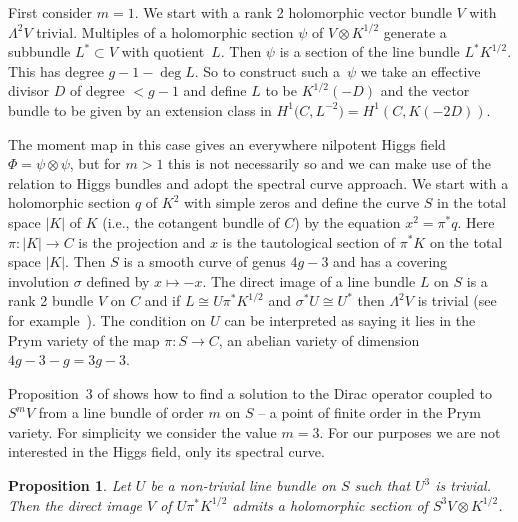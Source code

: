 \documentclass[11pt]{article}
\numberwithin{equation}{section}
\newtheorem{proposition}{Proposition}
\begin{document}
 First consider $m=1$.
We start with a rank 2 holomorphic vector bundle $V$ with $\Lambda^2V$ trivial. Multiples of a holomorphic section $\psi$ of $V\otimes K^{1/2}$ generate a subbundle $L^*\subset V$ with quotient~$L$. Then $\psi$ is a section of the line bundle $L^*K^{1/2}$. This has degree $g-1-\deg L$. So to construct such a~$\psi$ we take an effective divisor $D$ of degree $< g-1$ and define $L$ to be $K^{1/2}(-D)$ and the vector bundle to be given by an extension class in $H^1\big(C,L^{-2}\big)=H^1(C,K(-2D))$.

The moment map in this case gives an everywhere nilpotent Higgs field $\Phi=\psi\otimes \psi$, but for $m>1$ this is not necessarily so and we can make use of the relation to Higgs bundles and adopt the spectral curve approach.
We start with a holomorphic section $q$ of $K^2$ with simple zeros and define the curve $S$ in the total space $\vert K\vert$ of $K$ (i.e., the cotangent bundle of $C$) by the equation $x^2=\pi^*q$. Here $\pi\colon \vert K\vert \rightarrow C$ is the projection and $x$ is the tautological section of $\pi^*K$ on the total space $\vert K\vert $. Then $S$ is a smooth curve of genus $4g-3$ and has a covering involution $\sigma$ defined by $x\mapsto-x$. The direct image of a line bundle $L$ on $S$ is a rank 2 bundle $V$ on $C$ and if $L\cong U\pi^*K^{1/2}$ and $\sigma^*U\cong U^*$ then $\Lambda^2V$ is trivial (see for example~\cite{BeauvilleA/NarasimhanM/RamananS}). The condition on $U$ can be interpreted as saying it lies in the Prym variety of the map $\pi\colon S\rightarrow C$, an abelian variety of dimension $4g-3-g=3g-3$.

Proposition~3 of \cite{Hitchin2} shows how to find a solution to the Dirac operator coupled to $S^mV$ from a line bundle of order $m$ on $S$ -- a point of finite order in the Prym variety. For simplicity we consider the value $m=3$. For our purposes we are not interested in the Higgs field, only its spectral curve.

\begin{proposition} Let $U$ be a non-trivial line bundle on $S$ such that $U^3$ is trivial. Then the direct image $V$ of $U\pi^*K^{1/2}$ admits a holomorphic section of $S^3V\otimes K^{1/2}$.
\end{proposition}
\end{document}
